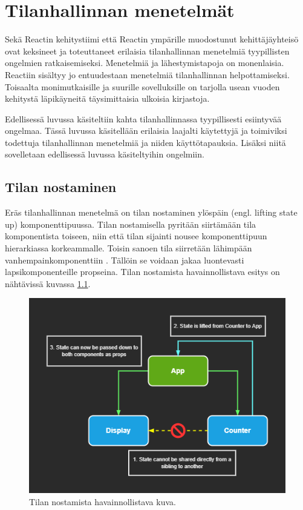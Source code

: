 \chapter{Tilanhallinnan menetelmät} \label{Tilanhallinnan menetelmät}
Sekä Reactin kehitystiimi että Reactin ympärille muodostunut kehittäjäyhteisö ovat keksineet ja toteuttaneet erilaisia tilanhallinnan menetelmiä tyypillisten ongelmien ratkaisemiseksi. Menetelmiä ja lähestymistapoja on monenlaisia. Reactiin sisältyy jo entuudestaan menetelmiä tilanhallinnan helpottamiseksi. Toisaalta monimutkaisille ja suurille sovelluksille on tarjolla usean vuoden kehitystä läpikäyneitä täysimittaisia ulkoisia kirjastoja.

Edellisessä luvussa käsiteltiin kahta tilanhallinnassa tyypillisesti esiintyvää ongelmaa. Tässä luvussa käsitellään erilaisia laajalti käytettyjä ja toimiviksi todettuja tilanhallinnan menetelmiä ja niiden käyttötapauksia. Lisäksi niitä sovelletaan edellisessä luvussa käsiteltyihin ongelmiin.


\section{Tilan nostaminen}
\label{Tilan nostaminen}

Eräs tilanhallinnan menetelmä on tilan nostaminen ylöspäin (engl. lifting state up) komponenttipuussa. Tilan nostamisella pyritään siirtämään tila komponentista toiseen, niin että tilan sijainti nousee komponenttipuun hierarkiassa korkeammalle. Toisin sanoen tila siirretään lähimpään vanhempainkomponenttiin \cite{reactdocsliftingstate}. Tällöin se voidaan jakaa luontevasti lapsikomponenteille propseina. Tilan nostamista havainnollistava esitys on nähtävissä kuvassa \ref{fig:lifting}.
\begin{figure}[h]
\centering \includegraphics[width=1\textwidth]{kuvat/Lifting state up.png}
\caption{Tilan nostamista havainnollistava kuva.}
\label{fig:lifting} 
\end{figure}

